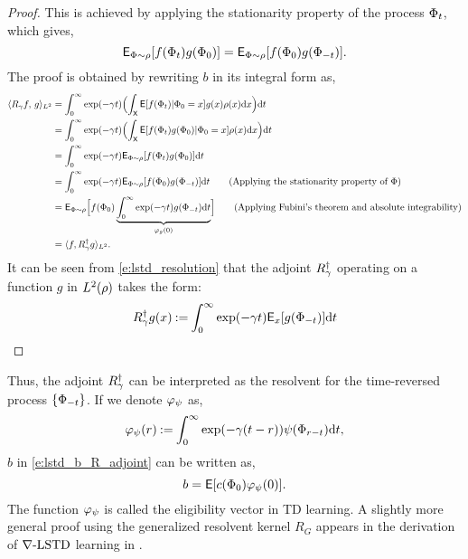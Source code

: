 \begin{proof}
 This is achieved by applying the stationarity property of the process $\Phi_t$, which gives, 
\begin{equation}
{\sf E}_{\Phi \sim \rho}[f(\Phi_t) g(\Phi_0)] = {\sf E}_{\Phi \sim \rho} [f(\Phi_0) g(\Phi_{-t})].
\end{equation} 
The proof is obtained by rewriting $b$ in its integral form as,
\begin{equation}
\begin{aligned}
\langle R_\discount f, \, g \rangle_{L^2} 
& = \int_0^\infty \exp(-\discount t)  \Bigl(\int_{\state} \Expect[f(\markovstate_t)| \markovstate_0 = x] g(x)  \pr(x) \ud x \Bigr) \ud t \\
& = \int_0^\infty \exp(-\discount t)  \Bigl(\int_{\state} \Expect[f(\markovstate_t) g(\markovstate_0)| \markovstate_0 = x]  \pr(x) \ud x \Bigr) \ud t \\
& = \int_0^\infty \exp(-\discount t) \Expect_{\markovstate \sim \pr}[f(\markovstate_t) g(\markovstate_0)]\ud t \\
& = \int_0^\infty \exp(-\discount t) \Expect_{\markovstate \sim \pr}[f(\markovstate_0) g(\markovstate_{-t})] \ud t \qquad \text{(Applying the stationarity property of $\markovstate$)}\\
& = \Expect_{\markovstate \sim \pr}\Bigl[f(\markovstate_0) \underbrace{\int_0^\infty \exp(-\discount t) g(\markovstate_{-t})\ud t}_{\eligibvector_g(0)}\Bigr]  \qquad \text{(Applying Fubini's theorem and absolute integrability)}\\
& = \langle f, R^\dagger_\discount g\rangle_{L^2}.
\label{e:lstd_resolution}
\end{aligned}
\end{equation}
It can be seen from \eqref{e:lstd_resolution} that the adjoint $R^\dagger_\gamma$ operating on a function $g$ in $L^2(\rho)$ takes the form:
\begin{equation}
R^\dagger_\discount g(x) \eqdef \int_0^\infty \exp(-\discount t ) \Expect_x[g(\markovstate_{-t})] \ud t %
\end{equation}
\end{proof}
Thus, the adjoint $R^\dagger_\gamma$ can be interpreted as the resolvent for the time-reversed process $\{\Phi_{-t}\}$. 
If we denote $\varphi_\psi$ as,
\begin{equation}
\eligibvector_\basis(r) \eqdef \int_0^\infty \exp(-\discount (t -r)) \basis(\markovstate_{r-t}) \ud t,
\label{e:lstd_eligib}
\end{equation}
$b$ in \eqref{e:lstd_b_R_adjoint} can be written as,
\begin{equation}
b = \Expect[c(\markovstate_0) \eligibvector_\basis(0)].
\label{e:lstd_b}
\end{equation}
The function $\varphi_\psi$ is called the eligibility vector in TD learning. A slightly more general proof using the generalized resolvent kernel $R_G$ appears in the derivation of $\nabla\text{-LSTD}$ learning in .

